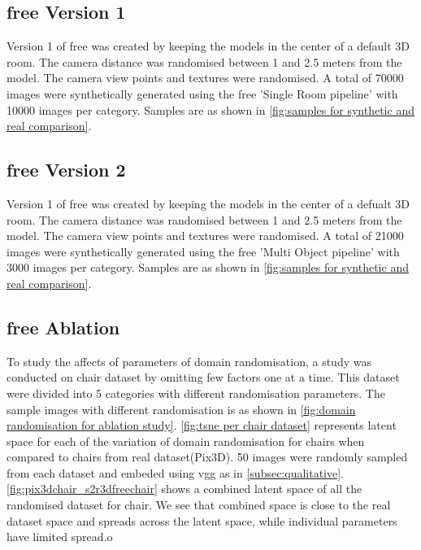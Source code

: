 \subsection{\gls{free} Version 1}
Version 1 of \gls{free} was created by keeping the models in the center of a default 3D room.
The camera distance was randomised between 1 and 2.5 meters from the model.
The camera view points and textures were randomised.
A total of 70000 images were synthetically generated using the \gls{free} 'Single Room pipeline' with 10000 images per category.
Samples are as shown in \autoref{fig:samples for synthetic and real comparison}.

\subsection{\gls{free} Version 2}
Version 1 of \gls{free} was created by keeping the models in the center of a defualt 3D room.
The camera distance was randomised between 1 and 2.5 meters from the model.
The camera view points and textures were randomised.
A total of 21000 images were synthetically generated using the \gls{free} 'Multi Object pipeline' with 3000 images per category.
Samples are as shown in \autoref{fig:samples for synthetic and real comparison}.

\subsection{\gls{free} Ablation}\label{subsec:s2r:3dfree-ablation}
To study the affects of parameters of domain randomisation, a study was conducted on chair dataset by omitting few factors one at a time.
This dataset were divided into 5 categories with different randomisation parameters.
The sample images with different randomisation is as shown in \autoref{fig:domain randomisation for ablation study}.
\autoref{fig:tsne per chair dataset} represents latent space for each of the variation of domain randomisation for chairs when compared to chairs from real dataset(Pix3D).
50 images were randomly sampled from each dataset and embeded using \gls{vgg} as in \autoref{subsec:qualitative}.
\autoref{fig:pix3dchair_s2r3dfreechair} shows a combined latent space of all the randomised dataset for chair.
We see that combined space is close to the real dataset space and spreads across the latent space, while individual parameters have limited spread.o

